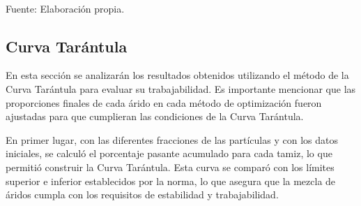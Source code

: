 \begin{table}[H]
\centering
\captionsetup{justification=centering}
\caption{Corrección por humedad y dosificación Fuller-Thompson.}
\label{tab:correccion-humedad-thomson}
\setlength{\tabcolsep}{6pt}
\renewcommand{\arraystretch}{1.15}
\small
{}
\\Fuente: Elaboración propia.
\end{table}


\subsection{Curva Tarántula}

En esta sección se analizarán los resultados obtenidos utilizando el método de la Curva Tarántula para evaluar su trabajabilidad. Es importante mencionar que las proporciones finales de cada árido en cada método de optimización fueron ajustadas para que cumplieran las condiciones de la Curva Tarántula.

En primer lugar, con las diferentes fracciones de las partículas y con los datos iniciales, se calculó el porcentaje pasante acumulado para cada tamiz, lo que permitió construir la Curva Tarántula. Esta curva se comparó con los límites superior e inferior establecidos por la norma, lo que asegura que la mezcla de áridos cumpla con los requisitos de estabilidad y trabajabilidad.

